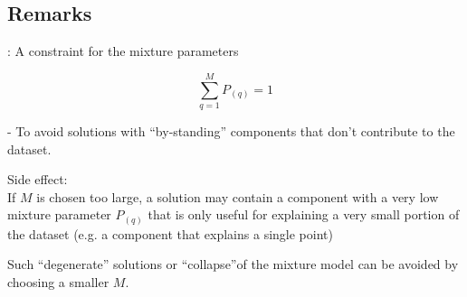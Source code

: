 \subsection{Remarks}

\begin{frame}{\subsecname: A constraint for the mixture parameters}


\svspace{-5mm}

\begin{equation}
\sum_{q=1}^M P_{(q)} = 1
\end{equation}

\pause

- To avoid solutions with ``by-standing'' components that don't contribute to the dataset.

Side effect:\\

If $M$ is chosen too large, a solution may contain a component with a very low mixture parameter $P_{(q)}$ that is only useful for explaining a very small portion of the dataset (e.g. a component that explains a single point)

Such ``degenerate'' solutions or ``collapse''of the mixture model can be avoided by choosing a smaller $M$.

\end{frame}
